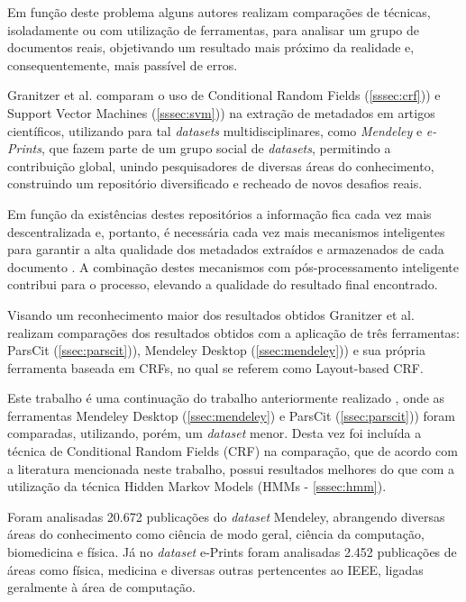 \begin{textnew}
Em função deste problema alguns autores realizam comparações de técnicas, isoladamente ou com utilização de ferramentas, para analisar um grupo de documentos reais, objetivando um resultado mais próximo da realidade e, consequentemente, mais passível de erros.

Granitzer et al. \cite{Granitzer-2012-LayoutBased} comparam o uso de Conditional Random Fields (\autoref{sssec:crf})) e Support Vector Machines (\autoref{sssec:svm})) na extração de metadados em artigos científicos, utilizando para tal \emph{datasets} multidisciplinares, como \emph{Mendeley} e \emph{e-Prints}, que fazem parte de um grupo social de \emph{datasets}, permitindo a contribuição global, unindo pesquisadores de diversas áreas do conhecimento, construindo um repositório diversificado e recheado de novos desafios reais.

Em função da existências destes repositórios a informação fica cada vez mais descentralizada e, portanto, é necessária cada vez mais mecanismos inteligentes para garantir a alta qualidade dos metadados extraídos e armazenados de cada documento \cite{Granitzer-2012-LayoutBased}. A combinação destes mecanismos com pós-processamento inteligente contribui para o processo, elevando a qualidade do resultado final encontrado.


Visando um reconhecimento maior dos resultados obtidos Granitzer et al. realizam comparações dos resultados obtidos com a aplicação de três ferramentas: ParsCit (\autoref{ssec:parscit})), Mendeley Desktop (\autoref{ssec:mendeley})) e sua própria ferramenta baseada em CRFs, no qual se referem como Layout-based CRF.

Este trabalho \cite{Granitzer-2012-LayoutBased} é uma continuação do trabalho anteriormente realizado \cite{Granitzer-2012-Crowdsourced}, onde as ferramentas Mendeley Desktop (\autoref{ssec:mendeley}) e ParsCit (\autoref{ssec:parscit})) foram comparadas, utilizando, porém, um \emph{dataset} menor. Desta vez foi incluída a técnica de Conditional Random Fields (CRF) na comparação, que de acordo com a literatura mencionada neste trabalho, possui resultados melhores do que com a utilização da técnica Hidden Markov Models (HMMs - \autoref{sssec:hmm}).

Foram analisadas 20.672 publicações do \emph{dataset} Mendeley, abrangendo diversas áreas do conhecimento como ciência de modo geral, ciência da computação, biomedicina e física. Já no \emph{dataset} e-Prints foram analisadas 2.452 publicações de áreas como física, medicina e diversas outras pertencentes ao IEEE, ligadas geralmente à área de computação.


\end{textnew}
